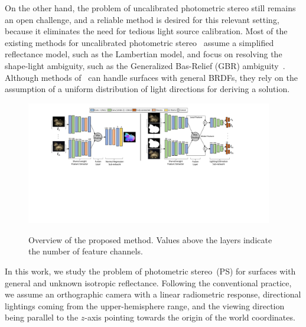 \documentclass[10pt,journal,compsoc]{IEEEtran}
\newcommand{\rev}[1]{#1}
\begin{document}
On the other hand, the problem of uncalibrated photometric stereo still remains an open challenge, and a reliable method is desired for this relevant setting, because it eliminates the need for tedious light source calibration.
Most of the existing methods for uncalibrated photometric stereo~\cite{alldrin2007r,shi2010self,papad14closed} assume a simplified reflectance model, such as the Lambertian model, and focus on resolving the shape-light ambiguity, such as the Generalized Bas-Relief (GBR) ambiguity~\cite{belhumeur1999bas}. Although methods of~\cite{lu2013uncalibrated,lu2015uncalibrated} can handle surfaces with general BRDFs, they rely on the assumption of a uniform distribution of light directions for deriving a solution.

\begin{figure}[t] \centering
    \includegraphics[width=0.96\textwidth]{images/Method/PS-FCN_LCNet.pdf} \\ \vspace{-0.3em}
    \caption{Overview of the proposed method. Values above the layers indicate the number of feature channels.} \label{fig:overview}
\end{figure}

In this work, we study the problem of photometric stereo~(PS) for surfaces with general and unknown isotropic reflectance. 
\rev{Following the conventional practice, we assume an orthographic camera with a linear radiometric response, directional lightings coming from the upper-hemisphere range, and the viewing direction being parallel to the $z$-axis pointing towards the origin of the world coordinates.}
\end{document}
